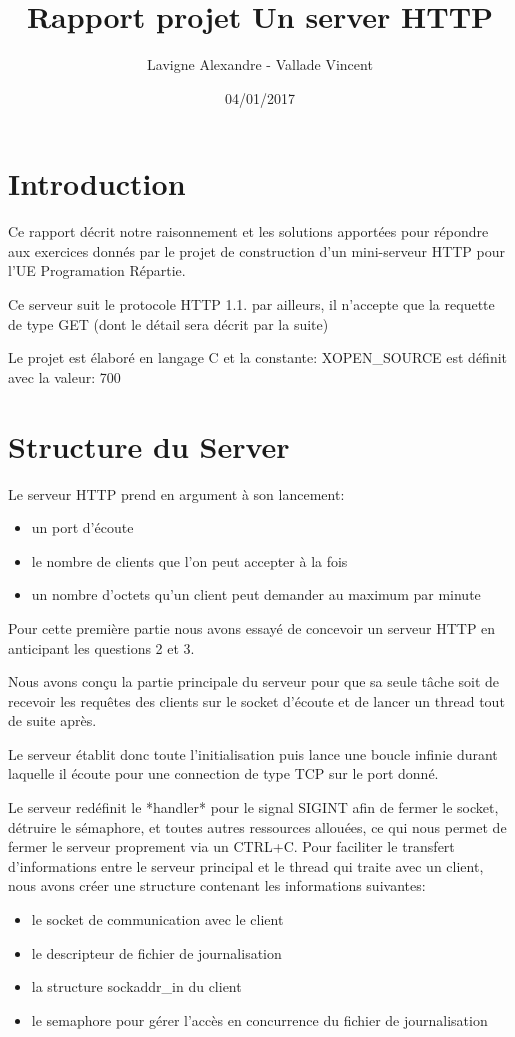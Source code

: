 \documentclass{report}
\title{Rapport projet Un server HTTP}
\author{Lavigne Alexandre - Vallade Vincent}
\date{04/01/2017}
\begin{document}
\maketitle

\section*{Introduction}

Ce rapport décrit notre raisonnement et les solutions apportées pour répondre aux exercices donnés
par le projet de construction d'un mini-serveur HTTP pour l'UE Programation Répartie.\hbox{}

Ce serveur suit le protocole HTTP 1.1. par ailleurs, il n'accepte que la requette de type GET (dont le détail sera décrit par la suite)\hbox{}

Le projet est élaboré en langage C et la constante: XOPEN\_SOURCE est définit avec la valeur: 700



\section{Structure du Server}

Le serveur HTTP prend en argument à son lancement:
\begin{itemize}
\item un port d'écoute
\item le nombre de clients que l'on peut accepter à la fois
\item un nombre d'octets qu'un client peut demander au maximum par minute
\end{itemize}

Pour cette première partie nous avons essayé de concevoir un serveur HTTP en anticipant les questions 2 et 3.\hbox{}

Nous avons conçu la partie principale du serveur pour que sa seule tâche soit de recevoir les requêtes des clients sur le socket d'écoute et de lancer un thread tout de suite après.\hbox{}

Le serveur établit donc toute l'initialisation puis lance une boucle infinie durant laquelle il écoute pour une connection de type TCP sur le port donné.
\hbox{}

Le serveur redéfinit le *handler* pour le signal SIGINT afin de fermer le socket, détruire le sémaphore, et toutes autres ressources allouées, ce qui nous permet de fermer le serveur proprement via un CTRL+C.
Pour faciliter le transfert d'informations entre le serveur principal et le thread qui traite avec un client, nous avons créer une structure contenant les informations suivantes:
\begin{itemize}
\item le socket de communication avec le client
\item le descripteur de fichier de journalisation
\item la structure sockaddr\_in du client
\item le semaphore pour gérer l'accès en concurrence du fichier de journalisation
\end{itemize}
\end{document}
